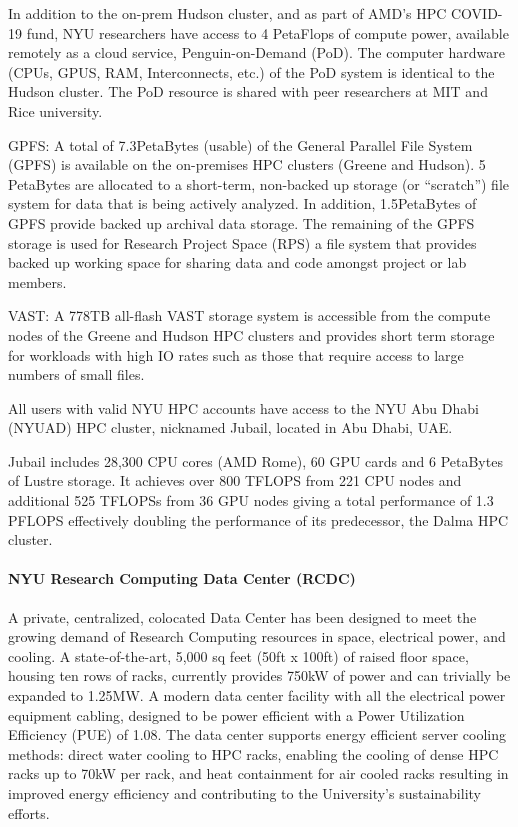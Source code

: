 In addition to the on-prem Hudson cluster, and as part of AMD's HPC COVID-19 fund, NYU researchers have access to 4 PetaFlops of compute power, available remotely as a cloud service, Penguin-on-Demand (PoD). The computer hardware (CPUs, GPUS, RAM, Interconnects, etc.) of the PoD system is identical to the Hudson cluster. The PoD resource is shared with peer researchers at MIT and Rice university.

GPFS: A total of 7.3PetaBytes (usable) of the General Parallel File System (GPFS) is available on the on-premises HPC clusters (Greene and Hudson). 5 PetaBytes are allocated to a short-term, non-backed up storage (or “scratch”) file system for data that is being actively analyzed. In addition, 1.5PetaBytes of GPFS provide backed up archival data storage. The remaining of the GPFS storage is used for Research Project Space (RPS) a file system that  provides backed up working space for sharing data and code amongst project or lab members.

VAST: A 778TB all-flash VAST storage system is accessible from the compute nodes of the Greene and Hudson HPC clusters and provides short term storage for workloads with high IO rates such as those that require access to large numbers of small files.

All users with valid NYU HPC accounts have access to the NYU Abu Dhabi (NYUAD) HPC cluster, nicknamed Jubail, located in Abu Dhabi, UAE.

Jubail includes 28,300 CPU cores (AMD Rome), 60 GPU cards and 6 PetaBytes of Lustre storage. It achieves over 800 TFLOPS from 221 CPU nodes and additional 525 TFLOPSs from 36 GPU nodes giving a total performance of 1.3 PFLOPS effectively doubling the performance of its predecessor, the Dalma HPC cluster.

\paragraph{NYU Research Computing Data Center (RCDC)}
A private, centralized, colocated Data Center has been designed to meet the growing demand of  Research Computing resources in space, electrical power, and cooling. A state-of-the-art, 5,000 sq feet (50ft x 100ft) of raised floor space, housing ten rows of racks, currently provides 750kW of power and can trivially be expanded to 1.25MW. A modern data center facility with all the electrical power equipment cabling, designed to be power efficient with a Power Utilization Efficiency (PUE) of 1.08. The data center supports energy efficient server cooling methods: direct water cooling to HPC racks, enabling the cooling of dense HPC racks up to 70kW per rack, and heat containment for air cooled racks resulting in improved energy efficiency and contributing to the University's sustainability efforts.

